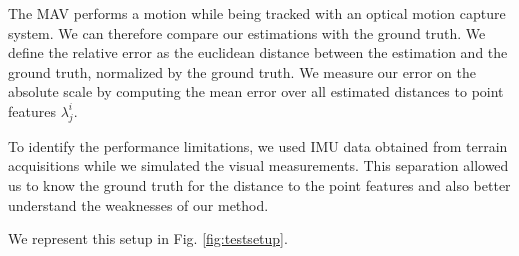 \documentclass[letterpaper, 10 pt, conference]{ieeeconf}  %
\begin{document}
The MAV performs a motion while being tracked with an optical motion capture system.
We can therefore compare our estimations with the ground truth.
We define the relative error as the euclidean distance between the estimation and the ground truth,
normalized by the ground truth.
We measure our error on the absolute scale by computing the mean error over all estimated distances to point features $\lambda_j^i$.

To identify the performance limitations, we used IMU data obtained from terrain acquisitions
while we simulated the visual measurements.
This separation allowed us to know the ground truth for the distance to the point features
and also better understand the weaknesses of our method. %

We represent this setup in Fig. \ref{fig:testsetup}.
\end{document}

